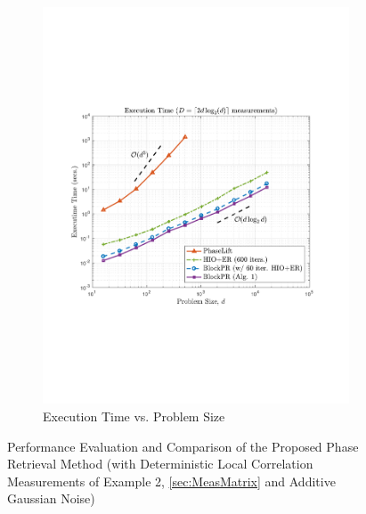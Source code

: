 \begin{figure}[hbtp]
\begin{subfigure}[b]{0.8\textwidth}
\centering
\includegraphics[clip=true, trim = 0.5in 2.5in 0.75in 2.5in,scale=0.55]{pics/fig5b}
\caption{Execution Time vs. Problem Size}
\label{fig:exectime}
\end{subfigure}
\caption[Reconstruction Error and Execution Time, Comparison Between Methods]{Performance Evaluation and Comparison of the Proposed Phase Retrieval Method (with Deterministic Local Correlation Measurements of Example 2, \cref{sec:MeasMatrix} and Additive Gaussian Noise)}
\label{fig:performance}
\end{figure}
%

